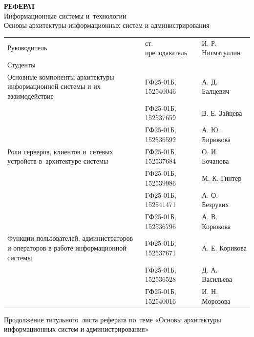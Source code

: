 \documentclass{ou}
\begin{document}
\thispagestyle{empty}
\begin{center}
\shortstack{\FGAVO}\vspace{4\baselineskip}
\textbf{РЕФЕРАТ}\\
Информационные системы и~технологии\\
Основы архитектуры информационных систем и администрирования\vspace{2\baselineskip}\end{center}
\begin{flushleft}
\doublespacing
\begin{tabularx}{\textwidth}{@{} p{} l l @{}}
Руководитель & ст. преподаватель & И. Р. Нигматуллин\\
Студенты     &                   &                  \\
\multirow{-2.27}{\hsize}{\singlespacing Основные компоненты архитектуры информационной системы и их взаимодействие}
             & ГФ25-01Б, 152540046 & А. Д. Балцевич\\
             & ГФ25-01Б, 152537659 & В. Е. Зайцева\\
             & ГФ25-01Б, 152536592 & А. Ю. Бирюкова\\   
\multirow{-2.27}{\hsize}{\singlespacing Роли серверов, клиентов и~сетевых устройств в~архитектуре системы}
             & ГФ25-01Б, 152537684 & О. И. Бочанова\\
             & ГФ25-01Б, 152539986 & М. К. Гинтер\\
             & ГФ25-01Б, 152541471 & А. О. Безруких\\
             & ГФ25-01Б, 152536796 & А. В. Корюкова\\       
\multirow{-2.27}{\hsize}{\singlespacing Функции пользователей, администраторов и операторов в работе информационной системы}
             & ГФ25-01Б, 152537671 & А. Е. Корикова\\
             & ГФ25-01Б, 152536528 & Д. А. Васильева\\
             & ГФ25-01Б, 152540016 & И. Н. Морозова\\  
\end{tabularx}
\end{flushleft}
\vspace*{\fill}
\begin{center}
\city
\end{center}
\newpage
\thispagestyle{empty}
Продолжение титульного~листа реферата по~теме «Основы архитектуры информационных систем и администрирования»
\end{document}

